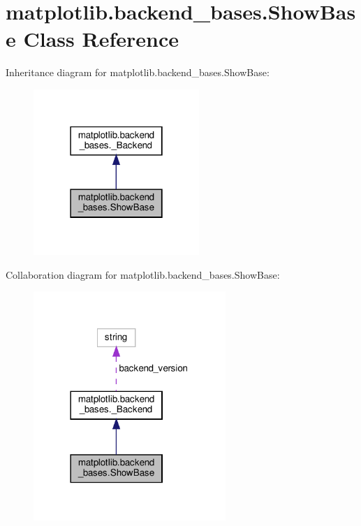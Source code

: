 \hypertarget{classmatplotlib_1_1backend__bases_1_1ShowBase}{}\section{matplotlib.\+backend\+\_\+bases.\+Show\+Base Class Reference}
\label{classmatplotlib_1_1backend__bases_1_1ShowBase}


Inheritance diagram for matplotlib.\+backend\+\_\+bases.\+Show\+Base\+:
\nopagebreak
\begin{figure}[H]
\begin{center}
\leavevmode
\includegraphics[width=178pt]{classmatplotlib_1_1backend__bases_1_1ShowBase__inherit__graph}
\end{center}
\end{figure}


Collaboration diagram for matplotlib.\+backend\+\_\+bases.\+Show\+Base\+:
\nopagebreak
\begin{figure}[H]
\begin{center}
\leavevmode
\includegraphics[width=206pt]{classmatplotlib_1_1backend__bases_1_1ShowBase__coll__graph}
\end{center}
\end{figure}
